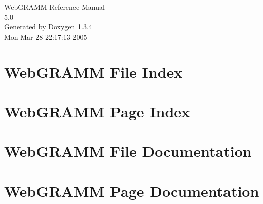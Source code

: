 \documentclass[a4paper]{book}
\begin{document}
\begin{titlepage}
\vspace*{7cm}
\begin{center}
{\Large Web\-GRAMM Reference Manual\\[1ex]\large 5.0 }\\
\vspace*{1cm}
{\large Generated by Doxygen 1.3.4}\\
\vspace*{0.5cm}
{\small Mon Mar 28 22:17:13 2005}\\
\end{center}
\end{titlepage}
\clearemptydoublepage
{}
\tableofcontents
\clearemptydoublepage
{}
\chapter{Web\-GRAMM File Index}

\chapter{Web\-GRAMM Page Index}

\chapter{Web\-GRAMM File Documentation}


\chapter{Web\-GRAMM Page Documentation}

\printindex
\end{document}
